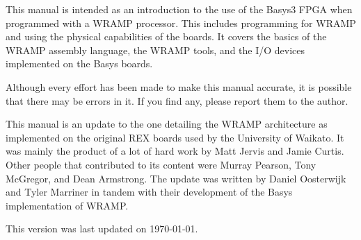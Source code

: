 This manual is intended as an introduction to the use of the Basys3 FPGA when
programmed with a WRAMP processor.
This includes programming for WRAMP and using the physical capabilities of the boards.
It covers the basics of the WRAMP assembly language, the WRAMP tools, and the I/O
devices implemented on the Basys boards.

Although every effort has been made to make this manual accurate, it is
possible that there may be errors in it. If you find any, please report
them to the author.

This manual is an update to the one detailing the WRAMP architecture as
implemented on the original REX boards used by the University of Waikato.
It was mainly the product of a lot of hard work by Matt Jervis
and Jamie Curtis. Other people that contributed to its content
were Murray Pearson, Tony McGregor, and Dean Armstrong.
The update was written by Daniel Oosterwijk and Tyler Marriner in
tandem with their development of the Basys implementation of WRAMP.

This version was last updated on \today.
